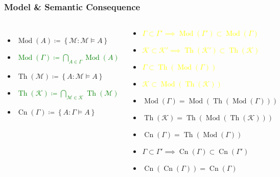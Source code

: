 \documentclass[UTF8,11pt,colorlinks,compress,openany]{beamer}%
\begin{document}
\begin{frame}\frametitle{Model \& Semantic Consequence}
\begin{columns}
	\begin{itemize}
		\item $\operatorname{Mod}(A)\coloneqq \left\{\mathcal{M}: \mathcal{M}\vDash A\right\}$
		\item \textcolor{green}{$\operatorname{Mod}(\Gamma)\coloneqq \bigcap\limits_{A\in\Gamma}\operatorname{Mod}(A)$}
		\item $\operatorname{Th}(\mathcal{M})\coloneqq \left\{A: \mathcal{M}\vDash A\right\}$
		\item \textcolor{green}{$\operatorname{Th}(\mathcal{K})\coloneqq \bigcap\limits_{\mathcal{M}\in\mathcal{K}}\operatorname{Th}(\mathcal{M})$}
		\item $\operatorname{Cn}(\Gamma)\coloneqq \left\{A: \Gamma\vDash A\right\}$
	\end{itemize}
	\begin{block}{}
		\begin{itemize}
			\item \textcolor{yellow}{$\Gamma\subset\Gamma'\implies\operatorname{Mod}(\Gamma')\subset\operatorname{Mod}(\Gamma)$}
			\item \textcolor{yellow}{$\mathcal{K}\subset\mathcal{K}'\implies\operatorname{Th}(\mathcal{K}')\subset\operatorname{Th}(\mathcal{K})$}
			\item \textcolor{yellow}{$\Gamma\subset\operatorname{Th}(\operatorname{Mod}(\Gamma))$}
			\item \textcolor{yellow}{$\mathcal{K}\subset\operatorname{Mod}(\operatorname{Th}(\mathcal{K}))$}
			\item $\operatorname{Mod}(\Gamma)=\operatorname{Mod}(\operatorname{Th}(\operatorname{Mod}(\Gamma)))$
			\item $\operatorname{Th}(\mathcal{K})=\operatorname{Th}(\operatorname{Mod}(\operatorname{Th}(\mathcal{K})))$
			\item $\operatorname{Cn}(\Gamma)=\operatorname{Th}(\operatorname{Mod}(\Gamma))$
			\item $\Gamma\subset\Gamma'\implies \operatorname{Cn}(\Gamma)\subset \operatorname{Cn}(\Gamma')$
			\item $\operatorname{Cn}(\operatorname{Cn}(\Gamma))=\operatorname{Cn}(\Gamma)$
		\end{itemize}
	\end{block}
\end{columns}
\end{frame}
\end{document}
